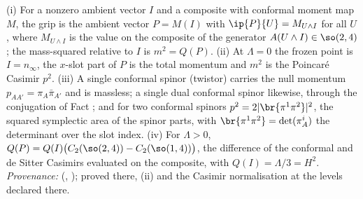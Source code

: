 (i) For a nonzero ambient vector $I$ and a composite with conformal moment map $M$, the grip is the ambient vector $P = M(I)$ with $\ip{P}{U} = M_{U \wedge I}$ for all $U$, where $M_{U \wedge I}$ is the value on the composite of the generator $A(U \wedge I) \in \so(2,4)$; the mass-squared relative to $I$ is $m^{2} = Q(P)$. (ii) At $\Lambda = 0$ the frozen point is $I = n_{\infty}$, the $x$-slot part of $P$ is the total momentum and $m^{2}$ is the Poincar\'e Casimir $p^{2}$. (iii) A single conformal spinor (twistor) carries the null momentum $p_{AA'} = \pi_{A}\bar\pi_{A'}$ and is massless; a single dual conformal spinor likewise, through the conjugation of Fact ; and for two conformal spinors $p^{2} = 2|\br{\pi^{1}\pi^{2}}|^{2}$, the squared symplectic area of the spinor parts, with $\br{\pi^{1}\pi^{2}} = \det(\pi^{i}_{A})$ the determinant over the slot index. (iv) For $\Lambda > 0$, $Q(P) = Q(I)\bigl(C_{2}(\so(2,4)) - C_{2}(\so(1,4))\bigr)$, the difference of the conformal and de Sitter Casimirs evaluated on the composite, with $Q(I) = \Lambda/3 = H^{2}$. \emph{Provenance:} \cite[Def.~5.4, Prop.~4.1, Prop.~5.7]{ButlerT11} (, ); proved there, (ii) and the Casimir normalisation at the levels declared there.
